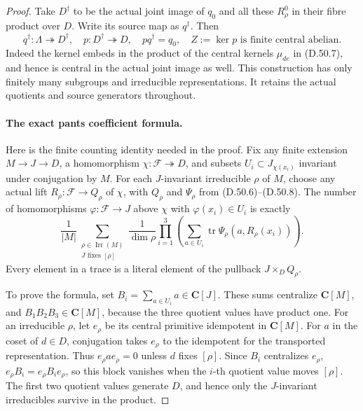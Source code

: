 \begin{proof}
Take \(D^\dagger\) to be the actual joint image of \(q_0\) and
all these \(R^0_\rho\) in their fibre product over \(D\).
Write its source map as \(q^\dagger\). Then
\[
 q^\dagger:\Lambda\twoheadrightarrow D^\dagger,
 \quad p:D^\dagger\twoheadrightarrow D,
 \quad pq^\dagger=q_0,
 \quad Z:=\ker p\text{ is finite central abelian}.
 \tag{D.50.10}
\]
Indeed the kernel embeds in the product of the central kernels
\(\mu_{de}\) in \textup{(D.50.7)}, and hence is central in the
actual joint image as well. This construction has only finitely
many subgroups and irreducible representations. It retains the
actual quotients and source generators throughout.

\paragraph{The exact pants coefficient formula.}
Here is the finite counting identity needed in the proof.
Fix any finite extension \(M\to J\to D\), a homomorphism
\(\chi:\mathcal F\twoheadrightarrow D\), and subsets
\(U_i\subset J_{\chi(x_i)}\) invariant under conjugation by \(M\).
For each \(J\)-invariant irreducible \(\rho\) of \(M\), choose
any actual lift \(R_\rho:\mathcal F\to Q_\rho\) of \(\chi\),
with \(Q_\rho\) and \(\Psi_\rho\) from
\textup{(D.50.6)--(D.50.8)}. The number of homomorphisms
\(\varphi:\mathcal F\to J\) above \(\chi\) with
\(\varphi(x_i)\in U_i\) is exactly
\[
 \frac1{|M|}\sum_{\substack{\rho\in\operatorname{Irr}(M)\\
                            J\text{ fixes }[\rho]}}
 \frac1{\dim\rho}
       \prod_{i=1}^3
         \left(\sum_{a\in U_i}
            \operatorname{tr}\Psi_\rho(a,R_\rho(x_i))\right).
 \tag{D.50.11}
\]
Every element in a trace is a literal element of the pullback
\(J\times_DQ_\rho\).

To prove the formula, set \(B_i=\sum_{a\in U_i}a\in\mathbf C[J]\).
These sums centralize \(\mathbf C[M]\), and
\(B_1B_2B_3\in\mathbf C[M]\), because the three quotient values
have product one. For an irreducible \(\rho\), let \(e_\rho\)
be its central primitive idempotent in \(\mathbf C[M]\).
For \(a\) in the coset of \(d\in D\), conjugation takes
\(e_\rho\) to the idempotent for the transported representation.
Thus \(e_\rho a e_\rho=0\) unless \(d\) fixes \([\rho]\).
Since \(B_i\) centralizes \(e_\rho\),
\(e_\rho B_i=e_\rho B_ie_\rho\), so this block vanishes when
the \(i\)-th quotient value moves \([\rho]\).
The first two quotient values generate \(D\), and hence only
the \(J\)-invariant irreducibles survive in the product.


\end{proof}
